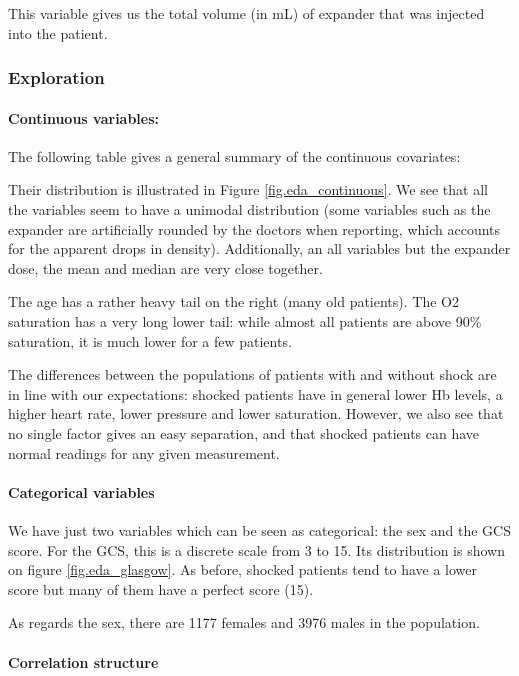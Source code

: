 This variable gives us the total volume (in mL) of expander that was injected into the patient.

			\subsubsection{Exploration}
\paragraph{Continuous variables:}
The following table gives a general summary of the continuous covariates:



Their distribution is illustrated in Figure \ref{fig.eda_continuous}. We see that all the variables seem to have a unimodal distribution (some variables such as the expander are artificially rounded by the doctors when reporting, which accounts for the apparent drops in density). Additionally, an all variables but the expander dose, the mean and median are very close together.

The age has a rather heavy tail on the right (many old patients). The O2 saturation has a very long lower tail: while almost all patients are above 90\% saturation, it is much lower for a few patients. 

The differences between the populations of patients with and without shock are in line with our expectations: shocked patients have in general lower Hb levels, a higher heart rate, lower pressure and lower saturation. However, we also see that no single factor gives an easy separation, and that shocked patients can have normal readings for any given measurement.



\paragraph{Categorical variables}
We have just two variables which can be seen as categorical: the sex and the GCS score. For the GCS, this is a discrete scale from 3 to 15. Its distribution is shown on figure \ref{fig.eda_glasgow}. As before, shocked patients tend to have a lower score but many of them have a perfect score (15). 

As regards the sex, there are 1177 females and 3976 males in the population.



\paragraph{Correlation structure}

